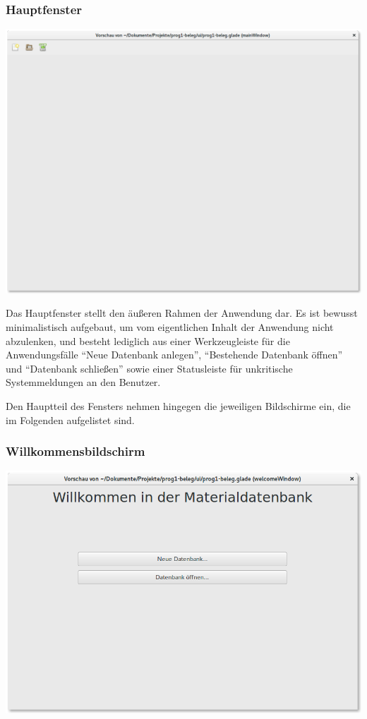 \subsubsection{Hauptfenster}
\begin{center}
\noindent\includegraphics[width=150mm,keepaspectratio]{images/04-hauptfenster.png}
\end{center}

Das Hauptfenster stellt den äußeren Rahmen der Anwendung dar. Es ist bewusst minimalistisch aufgebaut, um vom eigentlichen
Inhalt der Anwendung nicht abzulenken, und besteht lediglich aus einer Werkzeugleiste für die Anwendungsfälle
``Neue Datenbank anlegen'', ``Bestehende Datenbank öffnen'' und ``Datenbank schließen'' sowie einer Statusleiste
für unkritische Systemmeldungen an den Benutzer.

Den Hauptteil des Fensters nehmen hingegen die jeweiligen Bildschirme ein, die im Folgenden aufgelistet sind.

\subsubsection{Willkommensbildschirm}
\begin{center}
\noindent\includegraphics[width=150mm,keepaspectratio]{images/05-willkommensbildschirm.png}
\end{center}

